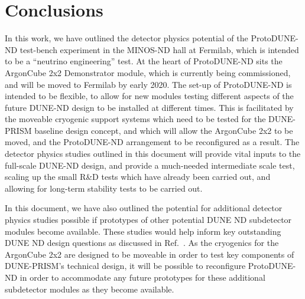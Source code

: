 \section{Conclusions}
\label{sec:conclusions}

In this work, we have outlined the detector physics potential of the ProtoDUNE-ND test-bench experiment in the MINOS-ND hall at Fermilab, which is intended to be a ``neutrino engineering'' test. At the heart of ProtoDUNE-ND sits the ArgonCube 2x2 Demonstrator module, which is currently being commissioned, and will be moved to Fermilab by early 2020. The set-up of ProtoDUNE-ND is intended to be flexible, to allow for new modules testing different aspects of the future DUNE-ND design to be installed at different times. This is facilitated by the moveable cryogenic support systems which need to be tested for the DUNE-PRISM baseline design concept, and which will allow the ArgonCube 2x2 to be moved, and the ProtoDUNE-ND arrangement to be reconfigured as a result. The detector physics studies outlined in this document will provide vital inputs to the full-scale DUNE-ND design, and provide a much-needed intermediate scale test, scaling up the small R\&D tests which have already been carried out, and allowing for long-term stability tests to be carried out.

In this document, we have also outlined the potential for additional detector physics studies possible if prototypes of other potential DUNE ND subdetector modules become available. These studies would help inform key outstanding DUNE ND design questions as discussed in Ref.~\cite{dune_ndcsg}. As the cryogenics for the ArgonCube 2x2 are designed to be moveable in order to test key components of DUNE-PRISM's technical design, it will be possible to reconfigure ProtoDUNE-ND in order to accommodate any future prototypes for these additional subdetector modules as they become available.
